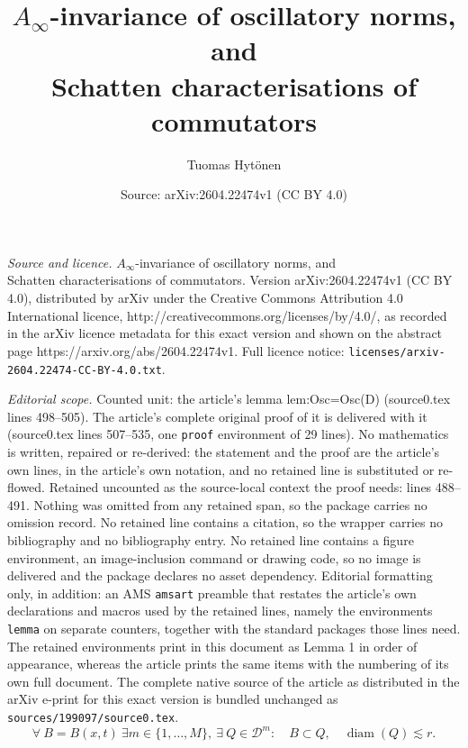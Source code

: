 \documentclass[10pt,a4paper]{amsart}
\title{$A_\infty$-invariance of oscillatory norms, and\\ Schatten characterisations of commutators}
\author{Tuomas Hyt\"onen}
\date{Source: arXiv:2604.22474v1 (CC BY 4.0)}
\begin{document}
\maketitle

\noindent\emph{Source and licence.} $A_\infty$-invariance of oscillatory norms, and\\ Schatten characterisations of commutators. Version arXiv:2604.22474v1 (CC BY 4.0), distributed by arXiv under the Creative Commons Attribution 4.0 International licence, http://creativecommons.org/licenses/by/4.0/, as recorded in the arXiv licence metadata for this exact version and shown on the abstract page https://arxiv.org/abs/2604.22474v1. Full licence notice: \texttt{licenses/arxiv-2604.22474-CC-BY-4.0.txt}.\par\smallskip

\noindent\textit{Editorial scope.} Counted unit: the article's lemma lem:Osc=Osc(D) (source0.tex lines 498--505). The article's complete original proof of it is delivered with it (source0.tex lines 507--535, one \texttt{proof} environment of 29 lines). No mathematics is written, repaired or re-derived: the statement and the proof are the article's own lines, in the article's own notation, and no retained line is substituted or re-flowed.  Retained uncounted as the source-local context the proof needs: lines 488--491.  Nothing was omitted from any retained span, so the package carries no omission record.  No retained line contains a citation, so the wrapper carries no bibliography and no bibliography entry.  No retained line contains a figure environment, an image-inclusion command or drawing code, so no image is delivered and the package declares no asset dependency.  Editorial formatting only, in addition: an AMS \texttt{amsart} preamble that restates the article's own declarations and macros used by the retained lines, namely the environments \texttt{lemma} on separate counters, together with the standard packages those lines need.  The retained environments print in this document as Lemma 1 in order of appearance, whereas the article prints the same items with the numbering of its own full document.  The complete native source of the article as distributed in the arXiv e-print for this exact version is bundled unchanged as \texttt{sources/199097/source0.tex}.
\begin{equation}\label{eq:adjacent}
  \forall\ B=B(x,t)\ \exists m\in\{1,\ldots,M\},\ \exists\ Q\in\mathscr D^m:\quad
  B\subset Q,\quad\operatorname{diam}(Q)\lesssim r.
\end{equation}
\end{document}
